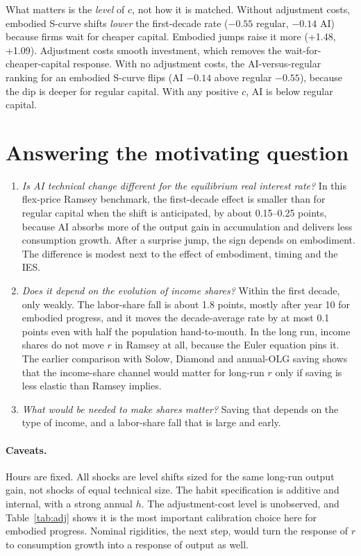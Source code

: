 \documentclass[11pt]{article}
\begin{document}
What matters is the \emph{level} of $c$, not how it is matched. Without adjustment costs, embodied S-curve
shifts \emph{lower} the first-decade rate ($-0.55$ regular, $-0.14$ AI) because firms wait for cheaper capital. Embodied jumps
raise it more (+1.48, +1.09). Adjustment costs smooth investment, which removes the wait-for-cheaper-capital response. With
no adjustment costs, the AI-versus-regular ranking for an embodied S-curve flips (AI $-0.14$ above regular $-0.55$),
because the dip is deeper for regular capital. With any positive $c$, AI is below regular capital.

\section{Answering the motivating question}

\begin{enumerate}
\item \emph{Is AI technical change different for the equilibrium real interest rate?} In this flex-price Ramsey
benchmark, the first-decade effect is smaller than for regular capital when the shift is anticipated, by about 0.15--0.25 points,
because AI absorbs more of the output gain in accumulation and delivers less consumption growth. After a surprise jump,
the sign depends on embodiment. The difference is modest next to the effect of embodiment, timing and the IES.
\item \emph{Does it depend on the evolution of income shares?} Within the first decade, only weakly. The labor-share fall is
about 1.8 points, mostly after year 10 for embodied progress, and it moves the decade-average rate by at most 0.1
points even with half the population hand-to-mouth. In the long run, income shares do not move $r$ in Ramsey at all,
because the Euler equation pins it. The earlier comparison with Solow, Diamond and annual-OLG saving shows that the
income-share channel would matter for long-run $r$ only if saving is less elastic than Ramsey implies.
\item \emph{What would be needed to make shares matter?} Saving that depends on the type of income, and a
labor-share fall that is large and early.
\end{enumerate}

\paragraph{Caveats.} Hours are fixed. All shocks are level shifts sized for the same long-run output gain, not shocks of equal
technical size. The habit specification is additive and internal, with a strong annual $h$. The adjustment-cost level is
unobserved, and Table~\ref{tab:adj} shows it is the most important calibration choice here for embodied progress.
Nominal rigidities, the next step, would turn the response of $r$ to consumption growth into a response of output as well.
\end{document}
